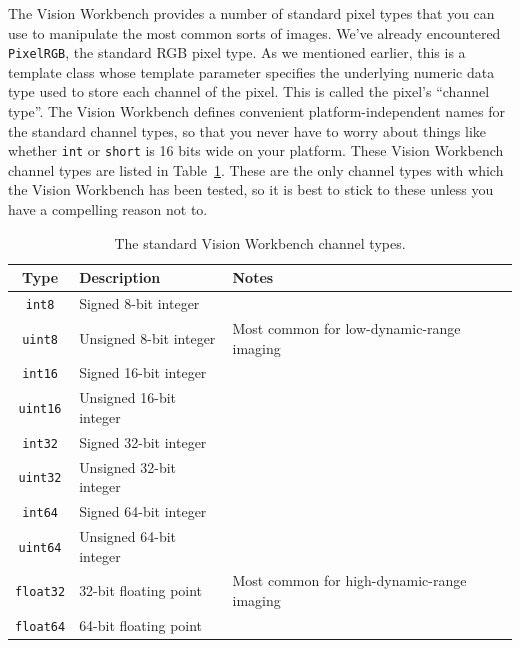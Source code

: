 The Vision Workbench provides a number of standard pixel types that
you can use to manipulate the most common sorts of images.  We've
already encountered \verb#PixelRGB#, the standard RGB pixel type.  As
we mentioned earlier, this is a template class whose template
parameter specifies the underlying numeric data type used to store
each channel of the pixel.  This is called the pixel's ``channel
type''.  The Vision Workbench defines convenient platform-independent
names for the standard channel types, so that you never have to worry
about things like whether \verb#int# or \verb#short# is 16 bits wide
on your platform.  These Vision Workbench channel types are listed in
Table~\ref{tbl:channel-types}.  These are the only channel types with
which the Vision Workbench has been tested, so it is best to stick to
these unless you have a compelling reason not to.

\begin{table}[t]\begin{centering}
\begin{tabular}{|c|l|l|} \hline
Type & Description & Notes \\ \hline \hline
\verb#int8# & Signed 8-bit integer & \\ \hline
\verb#uint8# & Unsigned 8-bit integer & Most common for low-dynamic-range imaging \\ \hline
\verb#int16# & Signed 16-bit integer & \\ \hline
\verb#uint16# & Unsigned 16-bit integer & \\ \hline
\verb#int32# & Signed 32-bit integer & \\ \hline
\verb#uint32# & Unsigned 32-bit integer & \\ \hline
\verb#int64# & Signed 64-bit integer & \\ \hline
\verb#uint64# & Unsigned 64-bit integer & \\ \hline
\verb#float32# & 32-bit floating point & Most common for high-dynamic-range imaging \\ \hline
\verb#float64# & 64-bit floating point & \\ \hline
\end{tabular}
\caption{The standard Vision Workbench channel types.}
\label{tbl:channel-types}
\end{centering}\end{table}

